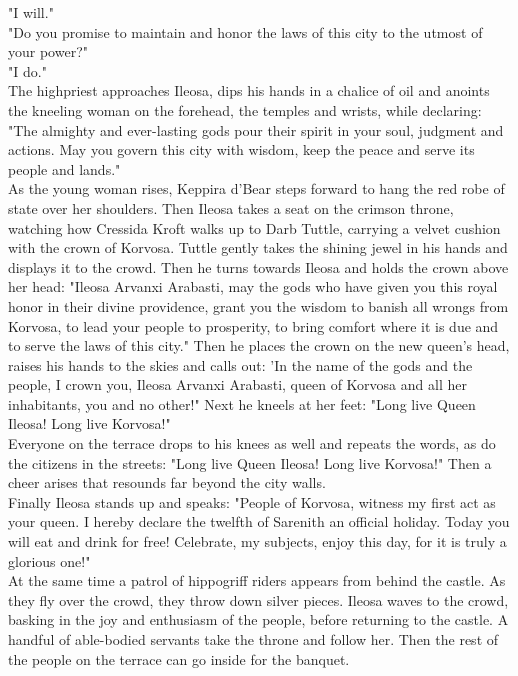 "I will."\\

"Do you promise to maintain and honor the laws of this city to the utmost of your power?"\\

"I do."\\

The highpriest approaches Ileosa, dips his hands in a chalice of oil and anoints the kneeling woman on the forehead, the temples and wrists, while declaring: "The almighty and ever-lasting gods pour their spirit in your soul, judgment and actions. May you govern this city with wisdom, keep the peace and serve its people and lands."\\

As the young woman rises, Keppira d'Bear steps forward to hang the red robe of state over her shoulders. Then Ileosa takes a seat on the crimson throne, watching how Cressida Kroft walks up to Darb Tuttle, carrying a velvet cushion with the crown of Korvosa. Tuttle gently takes the shining jewel in his hands and displays it to the crowd. Then he turns towards Ileosa and holds the crown above her head: "Ileosa Arvanxi Arabasti, may the gods who have given you this royal honor in their divine providence, grant you the wisdom to banish all wrongs from Korvosa, to lead your people to prosperity, to bring comfort where it is due and to serve the laws of this city." Then he places the crown on the new queen's head, raises his hands to the skies and calls out: 'In the name of the gods and the people, I crown you, Ileosa Arvanxi Arabasti, queen of Korvosa and all her inhabitants, you and no other!" Next he kneels at her feet: "Long live Queen Ileosa! Long live Korvosa!"\\

Everyone on the terrace drops to his knees as well and repeats the words, as do the citizens in the streets: "Long live Queen Ileosa! Long live Korvosa!" Then a cheer arises that resounds far beyond the city walls.\\

Finally Ileosa stands up and speaks: "People of Korvosa, witness my first act as your queen. I hereby declare the twelfth of Sarenith an official holiday. Today you will eat and drink for free! Celebrate, my subjects, enjoy this day, for it is truly a glorious one!"\\

At the same time a patrol of hippogriff riders appears from behind the castle. As they fly over the crowd, they throw down silver pieces. Ileosa waves to the crowd, basking in the joy and enthusiasm of the people, before returning to the castle. A handful of able-bodied servants take the throne and follow her. Then the rest of the people on the terrace can go inside for the banquet.\\

